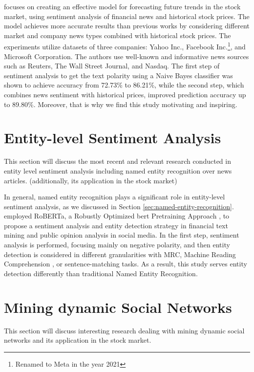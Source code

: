 \textcite{khedr2017predicting} focuses on creating an effective model for forecasting future trends in the stock market, using sentiment analysis of financial news and historical stock prices. The model achieves more accurate results than previous works by considering different market and company news types combined with historical stock prices. The experiments utilize datasets of three companies: Yahoo Inc., Facebook Inc.\footnote{Renamed to Meta in the year 2021}, and Microsoft Corporation. The authors use well-known and informative news sources such as Reuters, The Wall Street Journal, and Nasdaq. The first step of sentiment analysis to get the text polarity using a Naive Bayes classifier was shown to achieve accuracy from 72.73\% to 86.21\%, while the second step, which combines news sentiment with historical prices, improved prediction accuracy up to 89.80\%. Moreover, that is why we find this study motivating and inspiring.

\section{Entity-level Sentiment Analysis}
\label{sec:entity-level-sentiment-analysis}
This section will discuss the most recent and relevant research conducted in entity level sentiment analysis including named entity recognition over news articles. (additionally, its application in the stock market)

In general, named entity recognition plays a significant role in entity-level sentiment analysis, as we discussed in Section \ref{sec:named-entity-recognition}. \cite{zhao2021bert} employed RoBERTa, a Robustly Optimized \acrshort{bert} Pretraining Approach \parencite{liu2019roberta}, to propose a sentiment analysis and entity detection strategy in financial text mining and public opinion analysis in social media. In the first step, sentiment analysis is performed, focusing mainly on negative polarity, and then entity detection is considered in different granularities with MRC, Machine Reading Comprehension \parencite{liu2019mrc}, or sentence-matching tasks. As a result, this study serves entity detection differently than traditional Named Entity Recognition.

\section{Mining dynamic Social Networks}
\label{sec:mining-dynamic-social-networks}
This section will discuss interesting research \cite{Jin2012} dealing with mining dynamic social networks and its application in the stock market. 

